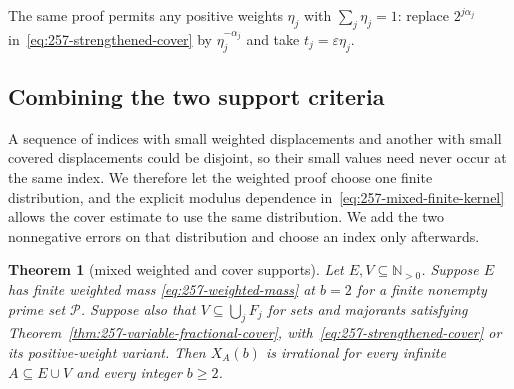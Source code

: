 \documentclass[11pt]{article}
\theoremstyle{plain}
\newtheorem{thm}{Theorem}[section]
\theoremstyle{definition}
\theoremstyle{remark}
\newcommand{\Npos}{\mathbb{N}_{>0}}
\begin{document}
The same proof permits any positive weights $\eta_j$ with $\sum_j\eta_j=1$:
replace $2^{j\alpha_j}$ in~\eqref{eq:257-strengthened-cover} by
$\eta_j^{-\alpha_j}$ and take $t_j=\varepsilon\eta_j$.
\subsection{Combining the two support criteria}
A sequence of indices with small weighted displacements and another
with small covered displacements could be disjoint, so their small values
need never occur at the same index. We therefore let the weighted proof
choose one finite distribution, and the explicit modulus dependence
in~\eqref{eq:257-mixed-finite-kernel} allows the cover estimate to use
the same distribution. We add the two nonnegative errors on that
distribution and choose an index only afterwards.
\begin{thm}[mixed weighted and cover supports]\label{thm:257-mixed-supports}
Let $E,V\subseteq\Npos$.  Suppose $E$ has finite weighted mass
\eqref{eq:257-weighted-mass} at $b=2$ for a finite nonempty prime set
$\mathcal P$.  Suppose also that $V\subseteq\bigcup_jF_j$ for sets and
majorants satisfying Theorem~\ref{thm:257-variable-fractional-cover},
with~\eqref{eq:257-strengthened-cover} or its positive-weight variant.
Then $X_A(b)$ is irrational for every
infinite $A\subseteq E\cup V$ and every integer $b\ge2$.
\end{thm}
\end{document}

